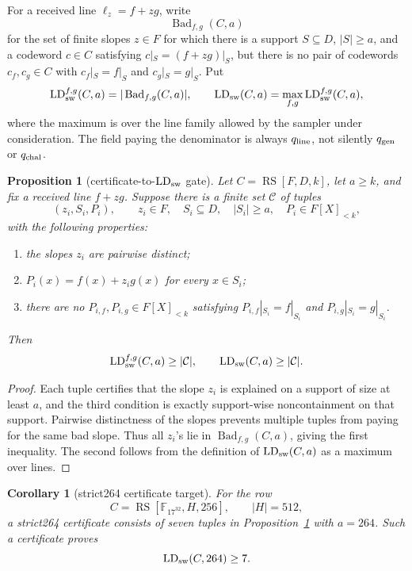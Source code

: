 \documentclass[11pt]{article}
\newtheorem{proposition}{Proposition}
\newtheorem{corollary}{Corollary}
\newcommand{\F}{\mathbb F}
\newcommand{\RS}{\operatorname{RS}}
\newcommand{\qline}{q_{\rm line}}
\newcommand{\qgen}{q_{\rm gen}}
\newcommand{\qchal}{q_{\rm chal}}
\begin{document}
For a received line \(\ell_z=f+zg\), write
\[
  \operatorname{Bad}_{f,g}(C,a)
\]
for the set of finite slopes \(z\in F\) for which there is a support
\(S\subseteq D\), \(|S|\ge a\), and a codeword \(c\in C\) satisfying
\(c|_S=(f+zg)|_S\), but there is no pair of codewords
\(c_f,c_g\in C\) with \(c_f|_S=f|_S\) and \(c_g|_S=g|_S\).  Put
\[
  \operatorname{LD}_{\rm sw}^{f,g}(C,a)
  =|\operatorname{Bad}_{f,g}(C,a)|,
  \qquad
  \operatorname{LD}_{\rm sw}(C,a)
  =\max_{f,g}\operatorname{LD}_{\rm sw}^{f,g}(C,a),
\]
where the maximum is over the line family allowed by the sampler under
consideration.  The field paying the denominator is always \(\qline\), not
silently \(\qgen\) or \(\qchal\).

\begin{proposition}[certificate-to-\(\operatorname{LD}_{\rm sw}\) gate]
\label{prop:certificate-to-ldsw}
Let \(C=\RS[F,D,k]\), let \(a\ge k\), and fix a received line \(f+zg\).  Suppose
there is a finite set \(\mathcal C\) of tuples
\[
  (z_i,S_i,P_i),
  \qquad z_i\in F,
  \quad S_i\subseteq D,
  \quad |S_i|\ge a,
  \quad P_i\in F[X]_{<k},
\]
with the following properties:
\begin{enumerate}
\item the slopes \(z_i\) are pairwise distinct;
\item \(P_i(x)=f(x)+z_i g(x)\) for every \(x\in S_i\);
\item there are no \(P_{i,f},P_{i,g}\in F[X]_{<k}\) satisfying
  \(P_{i,f}|_{S_i}=f|_{S_i}\) and \(P_{i,g}|_{S_i}=g|_{S_i}\).
\end{enumerate}
Then
\[
  \operatorname{LD}_{\rm sw}^{f,g}(C,a)\ge |\mathcal C|,
  \qquad
  \operatorname{LD}_{\rm sw}(C,a)\ge |\mathcal C|.
\]
\end{proposition}

\begin{proof}
Each tuple certifies that the slope \(z_i\) is explained on a support of size at
least \(a\), and the third condition is exactly support-wise noncontainment on
that support.  Pairwise distinctness of the slopes prevents multiple tuples from
paying for the same bad slope.  Thus all \(z_i\)'s lie in
\(\operatorname{Bad}_{f,g}(C,a)\), giving the first inequality.  The second
follows from the definition of \(\operatorname{LD}_{\rm sw}(C,a)\) as a maximum
over lines.
\end{proof}

\begin{corollary}[strict264 certificate target]
\label{cor:strict264-certificate-target}
For the row
\[
  C=\RS[\F_{17^{32}},H,256],
  \qquad |H|=512,
\]
a strict264 certificate consists of seven tuples in
Proposition~\ref{prop:certificate-to-ldsw} with \(a=264\).  Such a certificate
proves
\[
  \operatorname{LD}_{\rm sw}(C,264)\ge 7.
\]
\end{corollary}
\end{document}
